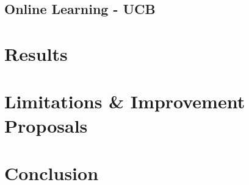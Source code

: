 \documentclass[12pt]{article}
\numberwithin{equation}{section}
\begin{document}
		\subsection{Online Learning - UCB}		\label{sec:implementation.ucb}

	\section{Results}		\label{sec:results}	%

	\section{Limitations \& Improvement Proposals}		\label{sec:limitations_improvements}

	\section{Conclusion}		\label{sec:conclusion}


	
	
\end{document}
